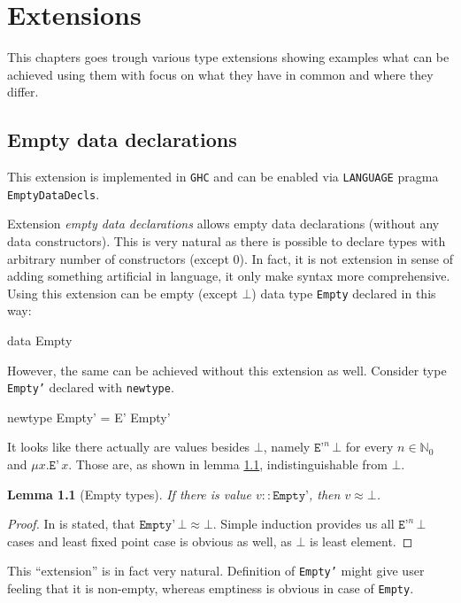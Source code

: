 \documentclass[11pt,oneside,draft]{fithesis2}
\newtheorem{lemma}{Lemma}
\begin{document}
\chapter{Extensions}

This chapters goes trough various type extensions showing examples
what can be achieved using them with focus on what they have in common
and where they differ.

\section{Empty data declarations}

This extension is implemented in \texttt{GHC} and can be enabled via
\texttt{LANGUAGE} pragma \texttt{EmptyDataDecls}.

Extension \emph{empty data declarations} allows empty data declarations
(without any data constructors). This is very natural as there is possible
to declare types with arbitrary number of constructors (except 0). In
fact, it is not extension in sense of adding something artificial in
language, it only make syntax more comprehensive. Using this extension can
be empty (except \(\bot\)) data type \texttt{Empty} declared in this way:
\begin{code}
data Empty
\end{code}
However, the same can be achieved without this extension as well. Consider type \texttt{Empty'}
declared with \texttt{newtype}.
\begin{code}
newtype Empty' = E' Empty'
\end{code}
It looks like there actually are values besides \(\bot\), namely \(\texttt{E'}^n \, \bot\)
for every \(n \in \mathbb{N}_0\) and \(\mu x . \texttt{E'} \, x\).
Those are, as shown in lemma \ref{emptyTypes}, indistinguishable from \(\bot\).

\begin{lemma}[Empty types]
\label{emptyTypes}
If there is value \(v :: \texttt{Empty'}\), then \(v \approx \bot\).
\end{lemma}

\begin{proof}
In \cite{haskell2010} is stated, that \(\texttt{Empty'} \, \bot \approx \bot\).
Simple induction provides us all \(\texttt{E'}^n \, \bot\) cases
and least fixed point case is obvious as well, as \(\bot\) is least element.
\end{proof}

This ``extension'' is in fact very natural. Definition of \texttt{Empty'}
might give user feeling that it is non-empty, whereas emptiness is
obvious in case of \texttt{Empty}.
\end{document}
